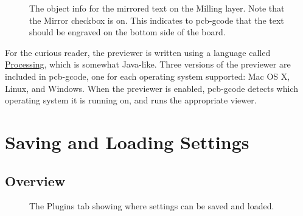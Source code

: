 \documentclass[11pt]{book}
\begin{document}
\begin{figure}
	\caption{The object info for the mirrored text on the Milling layer. Note that the Mirror checkbox is on. This indicates to pcb-gcode that the text should be engraved on the bottom side of the board.}
	\label{fig:MirroredTextInfo}
\end{figure}


\howitworks{}
For the curious reader, the previewer is written using a language called \href{http://processing.org}{Processing}, which is somewhat Java-like. Three versions of the previewer are included in pcb-gcode, one for each operating system supported: Mac OS X, Linux, and Windows. When the previewer is enabled, pcb-gcode detects which operating system it is running on, and runs the appropriate viewer.

%
%
\section{Saving and Loading Settings}\label{sec:SaveSettings}

\subsection{Overview}

\begin{figure}
	\caption{The Plugins tab showing where settings can be saved and loaded.}
	\label{fig:SaveSettings}
\end{figure}
\end{document}
